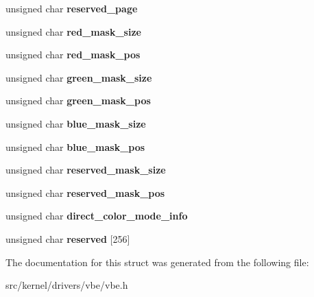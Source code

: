 \begin{DoxyCompactItemize}
\mbox{\label{structvbe__mode__info_adf0364bcac1870c1185c7f6970c1361b}} 
unsigned char {\bfseries reserved\+\_\+page}
\item 
\mbox{\label{structvbe__mode__info_ad3372516d304fc938a1cd515f554ee7d}} 
unsigned char {\bfseries red\+\_\+mask\+\_\+size}
\item 
\mbox{\label{structvbe__mode__info_a42ba03d041cfeae7c57f6b45509c13f9}} 
unsigned char {\bfseries red\+\_\+mask\+\_\+pos}
\item 
\mbox{\label{structvbe__mode__info_a4913b8efa7c6a9e25aee78e4c9a6c769}} 
unsigned char {\bfseries green\+\_\+mask\+\_\+size}
\item 
\mbox{\label{structvbe__mode__info_a72251498a8bd016d4ca70e467a52015b}} 
unsigned char {\bfseries green\+\_\+mask\+\_\+pos}
\item 
\mbox{\label{structvbe__mode__info_acabd28b7dce2667963db4dff04241e43}} 
unsigned char {\bfseries blue\+\_\+mask\+\_\+size}
\item 
\mbox{\label{structvbe__mode__info_af3bcb574babc2836e533991307bd0b31}} 
unsigned char {\bfseries blue\+\_\+mask\+\_\+pos}
\item 
\mbox{\label{structvbe__mode__info_aede8f60bf7809b4c9db35f86ffc218fc}} 
unsigned char {\bfseries reserved\+\_\+mask\+\_\+size}
\item 
\mbox{\label{structvbe__mode__info_a58e3a91cd3cfaa5970d924cf34631f89}} 
unsigned char {\bfseries reserved\+\_\+mask\+\_\+pos}
\item 
\mbox{\label{structvbe__mode__info_a5552bde48be28bb1d653dd7c188ed616}} 
unsigned char {\bfseries direct\+\_\+color\+\_\+mode\+\_\+info}
\item 
\mbox{\label{structvbe__mode__info_a00b2b08db84dc149c0549c8f814807db}} 
unsigned char {\bfseries reserved} \mbox{[}256\mbox{]}
\end{DoxyCompactItemize}


The documentation for this struct was generated from the following file\+:\begin{DoxyCompactItemize}
\item 
src/kernel/drivers/vbe/vbe.\+h\end{DoxyCompactItemize}
